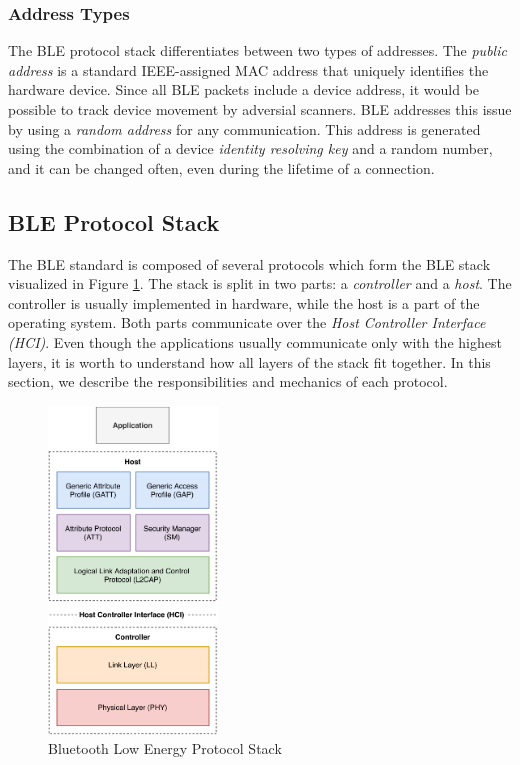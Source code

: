 \subsubsection{Address Types}

The BLE protocol stack differentiates between two types of addresses. The \textit{public address} is a standard IEEE-assigned MAC address that uniquely identifies the hardware device. Since all BLE packets include a device address, it would be possible to track device movement by adversial scanners. BLE addresses this issue by using a \textit{random address} for any communication. This address is generated using the combination of a device \textit{identity resolving key} and a random number, and it can be changed often, even during the lifetime of a connection.

\subsection{BLE Protocol Stack}

The BLE standard is composed of several protocols which form the BLE stack visualized in Figure \ref{ble_stack}. The stack is split in two parts: a \textit{controller} and a \textit{host}. The controller is usually implemented in hardware, while the host is a part of the operating system. Both parts communicate over the \textit{Host Controller Interface (HCI)}. Even though the applications usually communicate only with the highest layers, it is worth to understand how all layers of the stack fit together. In this section, we describe the responsibilities and mechanics of each protocol.

\begin{figure}
    \centering
    \includegraphics[width=0.40\textwidth]{diagrams/ble-stack}
    \caption{Bluetooth Low Energy Protocol Stack \cite{blebook}}
    \label{ble_stack}
\end{figure}

